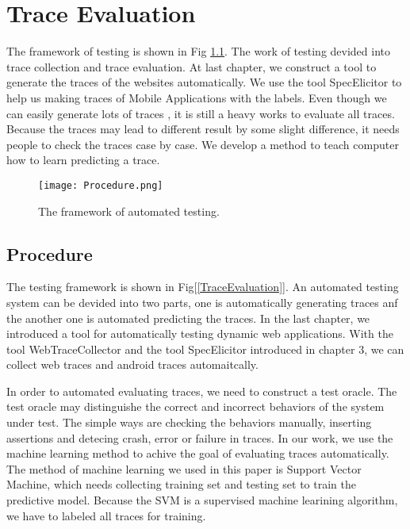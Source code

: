 
\chapter{Trace Evaluation}\label{ch:traceEvaluation}

The framework of testing is shown in Fig \ref{Proceduree}.
The work of testing devided into trace collection and trace evaluation.
At last chapter, we construct a tool to generate the traces of the websites automatically.
We use the tool SpecElicitor to help us making traces of Mobile Applications with the labels.
Even though we can easily generate lots of traces ,
it is still a heavy works to evaluate all traces.
Because the traces may lead to different result by some slight difference,
it needs people to check the traces case by case.
We develop a method to teach computer how to learn predicting a trace.

\begin{figure}[ht]
	\graphicspath{{pic/}}
	\begin{center}
		\texttt{[image: Procedure.png]}
	\end{center}
	\caption{ The framework of automated testing. }
	\label{Proceduree}
\end{figure}


\clearpage

\section{Procedure}

The testing framework is shown in Fig[\ref{TraceEvaluation}].
An automated testing system can be devided into two parts,
one is automatically generating traces anf the another one is automated predicting the traces.
In the last chapter, we introduced a tool for automatically testing dynamic web applications.
With the tool WebTraceCollector and the tool SpecElicitor introduced in chapter 3,
we can collect web traces and android traces automaitcally.

In order to automated evaluating traces,
we need to construct a test oracle.
The test oracle may distinguishe the correct and incorrect behaviors of the system under test.
The simple ways are checking the behaviors manually, inserting assertions and detecing crash, error or failure in traces.
In our work, we use the machine learning method to achive the goal of evaluating traces automatically.
The method of machine learning we used in this paper is Support Vector Machine,
which needs collecting training set and testing set to train the predictive model.
Because the SVM is a supervised machine learining algorithm,
we have to labeled all traces for training.

